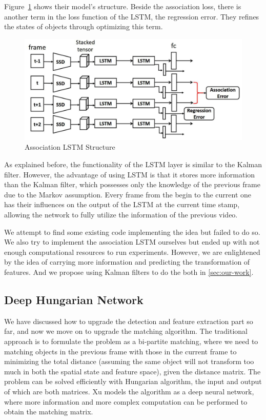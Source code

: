\documentclass[conference]{IEEEtran}
\begin{document}
Figure~\ref{fig:lstm-struct} shows their model's structure.
Beside the association loss, there is another term in the loss function of the LSTM, the regression error.
They refines the states of objects through optimizing this term.

\begin{figure}[h]
    \centering
    \includegraphics[width=0.99\linewidth]{fig/assoc_lstm.png}
    \caption{Association LSTM Structure\protect\footnotemark}
    \label{fig:lstm-struct}
\end{figure}

As explained before, the functionality of the LSTM layer is similar to the Kalman filter.
However, the advantage of using LSTM is that it stores more information than the Kalman filter, which possesses only the knowledge of the previous frame due to the Markov assumption.
Every frame from the begin to the current one has their influences on the output of the LSTM at the current time stamp, allowing the network to fully utilize the information of the previous video.

We attempt to find some existing code implementing the idea but failed to do so.
We also try to implement the association LSTM ourselves but ended up with not enough computational resources to run experiments.
However, we are enlightened by the idea of carrying more information and predicting the transformation of features.
And we propose using Kalman filters to do the both in \cref{sec:our-work}.

\subsection{Deep Hungarian Network}
We have discussed how to upgrade the detection and feature extraction part so far, and now we move on to upgrade the matching algorithm.
The traditional approach is to formulate the problem as a bi-partite matching, where we need to matching objects in the previous frame with those in the current frame to minimizing the total distance (assuming the same object will not transform too much in both the spatial state and feature space), given the distance matrix.
The problem can be solved efficiently with Hungarian algorithm, the input and output of which are both matrices.
Xu \cite{xu2019deepmot} models the algorithm as a deep neural network, where more information and more complex computation can be performed to obtain the matching matrix.
\end{document}

